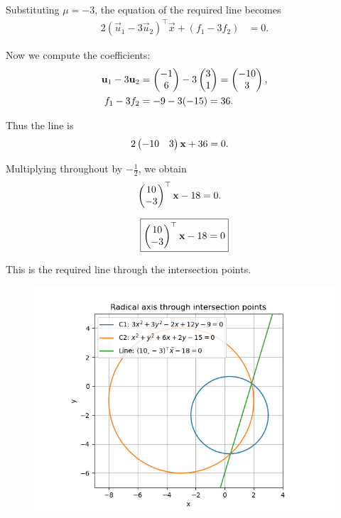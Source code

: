 \documentclass[12pt]{article}
\begin{document}
Substituting $\mu=-3$, the equation of the required line becomes
\begin{align}
2(\vec{u}_1-3\vec{u}_2)^\top \vec{x} + (f_1-3f_2) &= 0.
\end{align}

Now we compute the coefficients:
\begin{align}
\mathbf{u}_1-3\mathbf{u}_2 &= \begin{pmatrix}-1\\6\end{pmatrix} - 3\begin{pmatrix}3\\1\end{pmatrix} = \begin{pmatrix}-10\\3\end{pmatrix}, \\
f_1-3f_2 &= -9 - 3(-15) = 36.
\end{align}

Thus the line is
\begin{align}
2\begin{pmatrix}-10 & 3\end{pmatrix}\mathbf{x} + 36 &= 0.
\end{align}

Multiplying throughout by $-\tfrac{1}{2}$, we obtain
\begin{align}
\begin{pmatrix}10\\-3\end{pmatrix}^\top \mathbf{x} - 18 &= 0.
\end{align}

\begin{align}
\boxed{\begin{pmatrix}10\\-3\end{pmatrix}^\top \mathbf{x} - 18 = 0}
\end{align}

This is the required line through the intersection points.

\begin{figure}[H]
    \centering
    \includegraphics[width=0.9\columnwidth]{figs/radical.png}
    \caption{}
    \label{fig:placeholder}
\end{figure}
\end{document}
